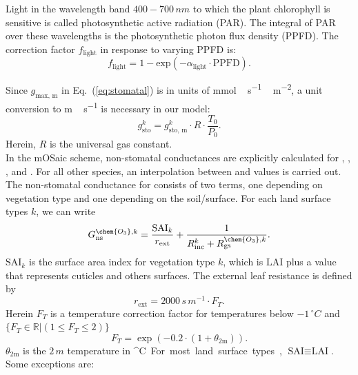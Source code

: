 \documentclass[gmd, manuscript]{copernicus}
\begin{document}
Light in the wavelength band $400-700\,\unit{nm}$ to which the plant chlorophyll is sensitive is called photosynthetic active radiation (PAR). The integral of PAR over these wavelengths is the photosynthetic photon flux density (PPFD). The correction factor $f_\mathrm{light}$ in response to varying PPFD is:
\begin{equation}
  f_\text{light} = 1-\text{exp}(-\alpha_\text{light}\cdot \text{PPFD}).
  \label{eq:flight}
\end{equation}

Since $g_\text{max, m}$ in Eq.~(\ref{eq:stomatal}) is in units of \unit{mmol\,s^{-1}\,m^{-2}}, a unit conversion to \unit{m\,s^{-1}} is necessary in our model:
\begin{equation}
  g^k_{\text{sto}} = g_{\text{sto, m}}^k \cdot R \cdot \frac{T_0}{P_0}.
\end{equation}
Herein, $R$ is the universal gas constant.\\
In the mOSaic scheme, non-stomatal conductances are explicitly calculated for , , , and . For all other species, an interpolation between  and  values is carried out.
The non-stomatal conductance for  consists of two terms, one depending on vegetation type and one depending on the soil/surface. For each land surface types $k$, we can write
\begin{equation}
  G_\text{ns}^{\chem{O_3}, k} = \frac{\text{SAI}_k}{r_\text{ext}} + \frac{1}{R_\text{inc}^k + R_\text{gs}^{\chem{O_3},k}}.
  \label{eq:non-stomata-cond}
\end{equation}
$\text{SAI}_k$ is the surface area index for vegetation type $k$, which is $\text{LAI}$ plus a value that represents cuticles and others surfaces. The external leaf resistance is defined by
\begin{equation}
  r_\text{ext} = 2000\,\unit{s\,m^{-1}}\cdot F_T.
\end{equation}
Herein $F_T$ is a temperature correction factor for temperatures below $-1\,\unit{^\circ C}$ and $\{F_T \in \mathbb{R} | (1 \leq F_T \leq 2)\}$
\begin{equation}
  F_T = \exp{(-0.2\cdot(1+\theta_\text{2m}))}.
\end{equation}
$\theta_\text{2m}$ is the $2\,\unit{m}$ temperature in \unit{^\circ C}. For most land surface types, $\text{SAI} \equiv \text{LAI}$. Some exceptions are: 
\end{document}
